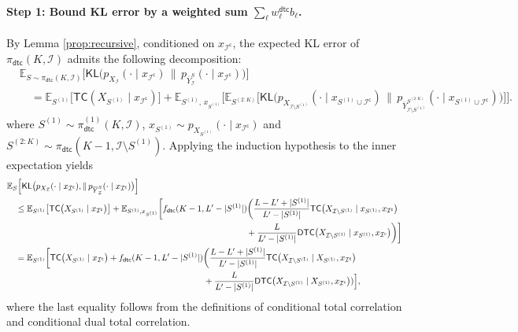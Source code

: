\documentclass[english]{article}
\newcommand{\cI}{\mathcal{I}}
\newcommand{\bE}{\mathbb{E}}
\newcommand{\KL}{\mathsf{KL}}
\newcommand{\ol}{\overline}
\newcommand{\E}{\mathbb{E}}
\newcommand{\TC}{\mathsf{TC}}
\newcommand{\DTC}{\mathsf{DTC}}
\newcommand{\dtc}{\mathsf{dtc}}
\begin{document}
\paragraph{Step 1: Bound KL error by a weighted sum $\sum_{\ell} w_\ell^\dtc b_\ell$.}
By Lemma \ref{prop:recursive}, conditioned on $x_{\cI^\mathsf{c}}$, the expected KL error of $ \pi_{\dtc}(K, \cI) $ admits the following decomposition:
\begin{align*}
    & \bE_{S \sim \pi_{\dtc}(K, \cI)} \Big[\KL\big(p_{X_{\cI}}(\cdot \mid x_{\cI^\mathsf{c}}) \,\|\, p_{\ol Y_{\cI}^S}(\cdot \mid x_{\cI^\mathsf{c}}) \big)\Big]\\ 
    & \quad = \bE_{S^{(1)}} \big[ \TC(X_{S^{(1)}}\mid x_{\cI^\mathsf{c}}) \big] + \bE_{S^{(1)},\,x_{S^{(1)}}} \bigg[ \bE_{S^{(2:K)}} \Big[\KL \big(p_{X_{\cI \setminus S^{(1)}}}(\cdot \mid x_{S^{(1)} \cup \cI^\mathsf{c}}) \,\|\, p_{\ol Y_{\cI \setminus S^{(1)}}^{S^{(2:K)}}}(\cdot \mid x_{S^{(1)} \cup \cI^\mathsf{c}} ) \big) \Big] \bigg]. 
\end{align*}
where $S^{(1)} \sim \pi_\dtc^{(1)}(K, \cI)$, $x_{S^{(1)}} \sim p_{X_{S^{(1)}}}(\cdot \mid x_{\cI^\mathsf{c}})$ and $S^{(2:K)} \sim \pi_{\dtc}(K-1, \cI \setminus S^{(1)})$. Applying the induction hypothesis to the inner expectation yields
\begin{align}
& \bE_{S} \Big[\KL\big(p_{X_{\cI}}(\cdot \mid x_{\cI^\mathsf{c}}) 	,\|\, p_{\ol Y_{\cI}^S}(\cdot 	\mid x_	{\cI^\mathsf{c}}) 	\big)\Big] 	\notag \\
    & \quad \leq \E_{S^{(1)}} \big[ \TC \big(X_{S^{(1)}}\mid x_{\cI^\mathsf{c}} \big) \big] + \E_{S^{(1)}, x_{S^{(1)}}} \bigg[ f_\dtc(K - 1, L' - |S^{(1)}|) \bigg( \frac{L-L'+|S^{(1)}| }{L'-|S^{(1)} |}\TC \big( X_{\cI \setminus S^{(1)}} \mid x_{S^{(1)}}, x_{\cI^\mathsf{c}} \big) \notag\\ 
    & \hspace{28em}+ \frac{L}{L'-|S^{(1)}| } \DTC \big( X_{\cI \setminus S^{(1)}} \mid x_{S^{(1)}}, x_{\cI^\mathsf{c}}\big) \bigg) \bigg]\notag \\
    & \quad = \E_{S^{(1)}} \bigg[ \TC \big(X_{S^{(1)}}\mid x_{\cI^\mathsf{c}} \big) + f_\dtc(K - 1, L' - |S^{(1)}|)\bigg( \frac{L-L'+|S^{(1)}| }{L'-|S^{(1)} |}\TC \big(X_{\cI \setminus S^{(1)} } \mid X_{S^{(1)} } , x_{\cI^\mathsf{c}} \big) \notag\\ 
    & \hspace{23em}+ \frac{L}{L'-|S^{(1)}| } \DTC \big(X_{\cI \setminus S^{(1)}} \mid X_{S^{(1)}}, x_{\cI^\mathsf{c}} \big) ) 	\Big] ,\label{eq:KL-decomp-DTC}
\end{align}
where the last equality follows from the definitions of conditional total correlation and conditional dual total correlation.
\end{document}
